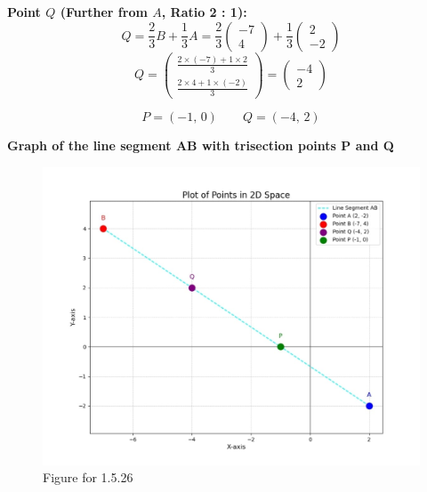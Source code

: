 \documentclass{beamer}
\begin{document}
\begin{frame}
\textbf{Point \( Q \) (Further from \( A \), Ratio 2 : 1):}
\[
Q = \frac{2}{3} B + \frac{1}{3} A 
= \frac{2}{3} \begin{pmatrix} -7 \\ 4 \end{pmatrix}
  + \frac{1}{3} \begin{pmatrix} 2 \\ -2 \end{pmatrix}
\]
\[
Q = \begin{pmatrix}
\frac{2 \times (-7) + 1 \times 2}{3} \\
\frac{2 \times 4 + 1 \times (-2)}{3}
\end{pmatrix}
= \begin{pmatrix} -4 \\ 2 \end{pmatrix}
\]

\[
\boxed{P = (-1,\,0)\qquad Q = (-4,\,2)}
\]
\end{frame}

\begin{frame}
    \vspace{5em}
\textbf{Graph of the line segment AB with trisection points P and Q}
\begin{figure}[H]
    \centering
    \includegraphics[width=0.75\columnwidth]{figs/1.jpg}
    \caption{Figure for 1.5.26}
    \label{fig1}
\end{figure}
\end{frame}
\end{document}
